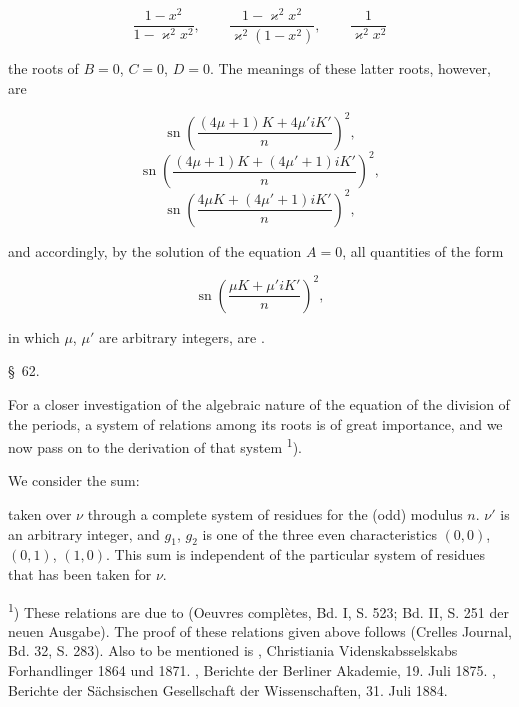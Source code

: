 
\[
\frac{1-x^2}{1-\varkappa^2 x^2}, \qquad \frac{1-\varkappa^2 x^2}{\varkappa^2(1-x^2)}, \qquad \frac{1}{\varkappa^2 x^2}
\]

the roots of $B = 0$, $C = 0$, $D = 0$. The meanings of these latter
roots, however, are %

\[
\operatorname{sn}\left(\frac{(4\mu+1)K + 4\mu' iK'}{n}\right)^2,
\]
\[
\operatorname{sn}\left(\frac{(4\mu+1)K + (4\mu'+1)iK'}{n}\right)^2,
\]
\[
\operatorname{sn}\left(\frac{4\mu K + (4\mu'+1)iK'}{n}\right)^2,
\]

and accordingly, by the solution of the equation $A = 0$, all
quantities of the form

\[
\operatorname{sn}\left(\frac{\mu K + \mu' iK'}{n}\right)^2,
\]

in which $\mu$, $\mu'$ are arbitrary integers, are .

\begin{center}
\S\ 62. \quad {}
\end{center}

For a closer investigation of the algebraic nature of the equation of
the division of the periods, a system of relations among its roots is
of great importance, and we now pass on to the derivation of that
system \textsuperscript{1}).

We consider the sum:


taken over $\nu$ through a complete system of residues for the (odd)
modulus $n$. $\nu'$ is an arbitrary integer, and $g_1$, $g_2$ is one of
the three even characteristics $(0,0)$, $(0,1)$, $(1,0)$. This sum
is independent of the particular system of residues that has been
taken for $\nu$.

\begingroup
\footnotesize
\textsuperscript{1}) These relations are due to  (Oeuvres complètes, Bd. I,
S. 523; Bd. II, S. 251 der neuen Ausgabe). The proof of these relations
given above follows  (Crelles Journal, Bd. 32,
S. 283). Also to be mentioned is , Christiania Videnskabsselskabs
Forhandlinger 1864 und 1871. , Berichte der Berliner Akademie,
19. Juli 1875. , Berichte der Sächsischen Gesellschaft der Wissenschaften, 31. Juli 1884.
\endgroup

